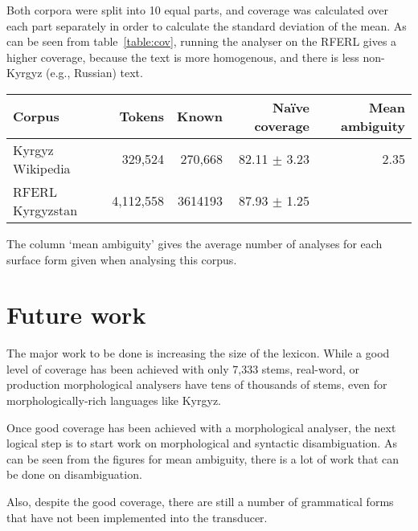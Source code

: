 \documentclass[10pt,a4paper,twocolumn]{article}
\newcommand{\eng}[1]{`{\em #1}'}
\begin{document}
Both corpora were split into 10 equal parts, and coverage was calculated over each part separately in order to calculate the standard deviation of the mean. As can be seen from table~\ref{table:cov}, running the analyser on the RFERL gives a higher coverage, because the text is more homogenous, and there is less non-Kyrgyz (e.g., Russian) text.

\begin{table*}[htbp]
	\centering
	\begin{tabular}{lrrrr}
		\toprule
		Corpus           & Tokens    & Known     & Naïve coverage    & Mean ambiguity\\
		\midrule
		Kyrgyz Wikipedia & 329,524   & 270,668   & 82.11 $\pm$ 3.23  & 2.35\\
		RFERL Kyrgyzstan & 4,112,558 & 3614193   & 87.93 $\pm$ 1.25  & \\
		\bottomrule
	\end{tabular}
	\caption{FIXME}
	\label{table:cov}
\end{table*}

The column `mean ambiguity' gives the average number of analyses for each surface form given when analysing this corpus.

\section{Future work}

The major work to be done is increasing the size of the lexicon. While a good level of coverage has been achieved with only 7,333 stems, real-word, or production morphological analysers have tens of thousands of stems, even for morphologically-rich languages like Kyrgyz.

Once good coverage has been achieved with a morphological analyser, the next logical step is to start work on morphological and syntactic disambiguation. As can be seen from the figures for mean ambiguity, there is a lot of work that can be done on disambiguation.

Also, despite the good coverage, there are still a number of grammatical forms that have not been implemented into the transducer.  %
\end{document}
